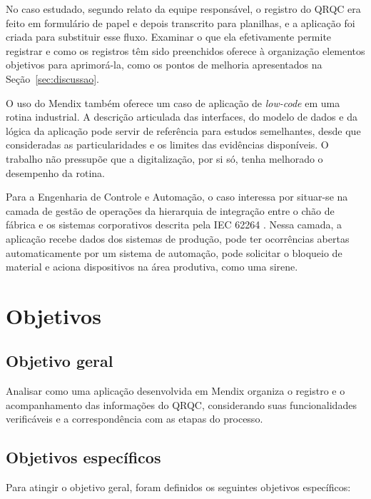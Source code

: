 No caso estudado, segundo relato da equipe responsável, o registro do QRQC era feito em formulário de papel e depois transcrito para planilhas, e a aplicação foi criada para substituir esse fluxo. Examinar o que ela efetivamente permite registrar e como os registros têm sido preenchidos oferece à organização elementos objetivos para aprimorá-la, como os pontos de melhoria apresentados na Seção~\ref{sec:discussao}.

O uso do Mendix também oferece um caso de aplicação de \textit{low-code} em uma rotina industrial. A descrição articulada das interfaces, do modelo de dados e da lógica da aplicação pode servir de referência para estudos semelhantes, desde que consideradas as particularidades e os limites das evidências disponíveis. O trabalho não pressupõe que a digitalização, por si só, tenha melhorado o desempenho da rotina.

Para a Engenharia de Controle e Automação, o caso interessa por situar-se na camada de gestão de operações da hierarquia de integração entre o chão de fábrica e os sistemas corporativos descrita pela IEC 62264 \cite[p.~589, 591--592]{mantravadi2019}. Nessa camada, a aplicação recebe dados dos sistemas de produção, pode ter ocorrências abertas automaticamente por um sistema de automação, pode solicitar o bloqueio de material e aciona dispositivos na área produtiva, como uma sirene.

\section{Objetivos}

\subsection{Objetivo geral}

Analisar como uma aplicação desenvolvida em Mendix organiza o registro e o acompanhamento das informações do QRQC, considerando suas funcionalidades verificáveis e a correspondência com as etapas do processo.

\subsection{Objetivos específicos}

Para atingir o objetivo geral, foram definidos os seguintes objetivos específicos:

